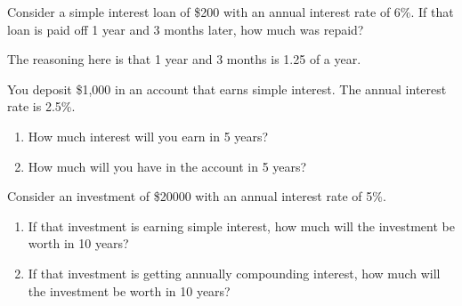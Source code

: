 \begin{sol}
 


 

\end{sol}


\begin{stmt}
Consider a simple interest loan of \$200 with an annual interest rate of 6\%. If that loan is paid off 1 year and 3 months later, how much was repaid?
\end{stmt}

\begin{sol}


The reasoning here is that 1 year and 3 months is 1.25 of a year.
\end{sol}


\begin{stmt}
You deposit \$1,000 in an account that earns simple interest. The annual interest rate is 2.5\%.
\begin{enumerate}[label=(\alph*), leftmargin=2em, topsep=2pt, itemsep=1pt]
\item How much interest will you earn in 5 years?
\item How much will you have in the account in 5 years?
\end{enumerate}
\end{stmt}

\begin{sol}
 


 

\end{sol}


\begin{stmt}
Consider an investment of \$20000 with an annual interest rate of 5\%.
\begin{enumerate}[label=(\alph*), leftmargin=2em, topsep=2pt, itemsep=1pt]
\item If that investment is earning simple interest, how much will the investment be worth in 10 years?
\item If that investment is getting annually compounding interest, how much will the investment be worth in 10 years?
\end{enumerate}
\end{stmt}

